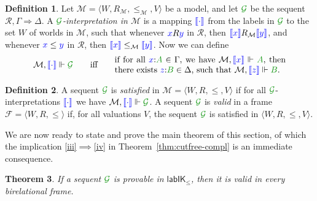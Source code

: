 \documentclass[a4paper]{article}
\theoremstyle{plain}
\newtheorem{theorem}{Theorem}[section]
\theoremstyle{definition}
\newtheorem{definition}[theorem]{Definition}
\newcommand*{\SG}{\fm{\mathcal{G}}}
\newcommand*{\IK}{\mathsf{IK}}
\newcommand*{\labIKp}{\lab\IK_{\le}}
\newcommand{\lseq}[3]{#1 , #2 \SEQ #3}
\newcommand{\B}{\mathcal{R}}
\newcommand{\Left}{\Gamma} %
\newcommand{\Right}{\Delta} %
\newcommand*{\fm}[1]{{\color{notgreen}{#1}}}
\newcommand*{\lb}[1]{{\color{blue}{#1}}}
\newcommand*{\rel}{R}
\newcommand*{\labels}[2]{\lb{#1}\mathord{:}\fm{#2}}
\newcommand*{\accs}[2]{\lb{#1}R\lb{#2}}
\newcommand*{\futs}[2]{\lb{#1}\le{\lb{#2}}}
\newcommand{\SEQ}{\Longrightarrow}
\newcommand*{\lab}{\mathsf{lab}}
\newcommand{\M}{\mathcal{M}}
\newcommand{\F}{\mathcal{F}}
\newcommand{\inter}[1]{\lb{\llbracket #1\rrbracket}}
\begin{document}
\begin{definition}\label{def:force-seq}
	Let $\M = \langle W, \rel_\M, \le_\M, V \rangle$ be a model, and let
	$\SG$ be the sequent $\lseq\B\Left\Right$. 
	A \emph{$\SG$-interpretation
		in $\M$} is a mapping $\inter{\cdot}$ from the labels in $\SG$ to the set $W$ of worlds in $\M$, such that whenever $\accs xy$ in $\B$, then $\inter x\rel_\M\inter y$, and whenever $\futs xy$ in $\B$, then $\inter x\le_\M\inter y$. Now we can define 
	\begin{equation}
	\M,\inter\cdot\Vdash\SG\qquad\mbox{iff}\qquad
	\parbox{20em}{if for all $\labels{x}{A} \in \Gamma$, we have $\M, \inter x \Vdash \fm A$, then there exists $\labels{z}{B} \in \Delta$, such that $\M, \inter z \Vdash \fm B$.}
	\end{equation}
\end{definition}

\begin{definition}\label{def:valid-seq}
	A sequent $\SG$ is \emph{satisfied} in $\M = \langle W, \rel, \le, V
	\rangle$ if for all $\SG$-interpretations $\inter\cdot$ we have
	$\M,\inter\cdot\Vdash\SG$.
	A sequent $\SG$ is \emph{valid} in a frame $\F = \langle W, \rel,
	\le \rangle$ if, for all valuations $V$, the sequent $\SG$ is
	satisfied in $\langle W, R, \le, V \rangle$.
\end{definition}

We are now ready to state and prove the main theorem of this section, of which
the implication \ref{iii}$\implies$\ref{iv} in
Theorem~\ref{thm:cutfree-compl} is an immediate consequence.

\begin{theorem}\label{thm:soundness}
	If a sequent $\SG$ is provable in $\labIKp$, then it is valid in every birelational frame.
\end{theorem}
\end{document}
